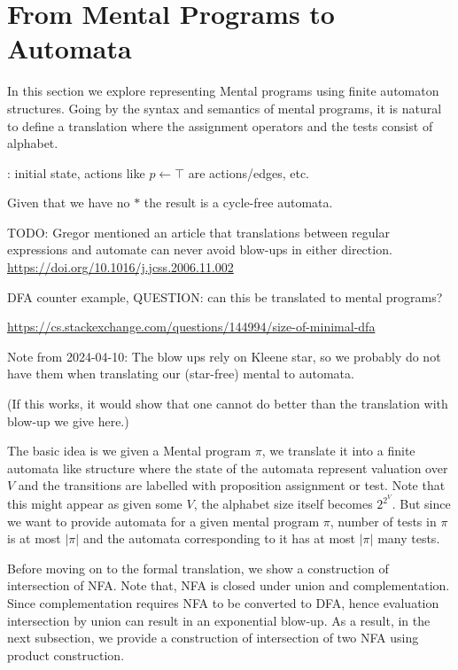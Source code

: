 \section{From Mental Programs to Automata}


In this section we explore representing Mental programs using finite automaton structures. Going by the syntax and semantics of mental programs, it is natural to define a translation where the assignment operators and the tests consist of alphabet.

: initial state, actions like $p \leftarrow \top$ are actions/edges, etc.

Given that we have no $\ast$ the result is a cycle-free automata.

TODO: Gregor mentioned an article that translations between regular expressions and automate can never avoid blow-ups in either direction.
\url{https://doi.org/10.1016/j.jcss.2006.11.002}

DFA counter example, QUESTION: can this be translated to mental programs?

\url{https://cs.stackexchange.com/questions/144994/size-of-minimal-dfa}

Note from 2024-04-10: The blow ups rely on Kleene star, so we probably do not have them when translating our (star-free) mental to automata.

(If this works, it would show that one cannot do better than the translation with blow-up we give here.)


The basic idea is we given a Mental program $\pi$, we translate it into a finite automata like structure where the state of the automata represent valuation over $V$ and the transitions are labelled with proposition assignment or test. Note that this might appear as given some $V$, the alphabet size itself becomes $2^{2^V}$. But since we want to provide automata for a given mental program $\pi$, number of tests in $\pi$ is at most $|\pi|$ and the automata corresponding to it has at most $|\pi|$ many tests.

Before moving on to the formal translation, we show a construction of intersection of NFA. Note that, NFA is closed under union and complementation. Since complementation requires NFA to be converted to DFA, hence evaluation intersection by union can result in an exponential blow-up. As a result, in the next subsection, we provide a construction of intersection of two NFA using product construction.
